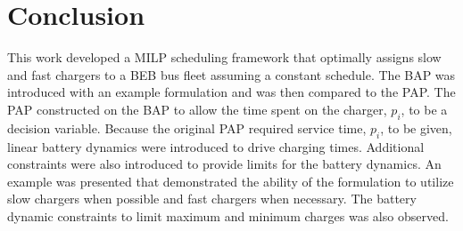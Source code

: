 \documentclass[letterpaper, 10pt, conference]{IEEEtran}
\begin{document}
\section{Conclusion}
\label{sec:conclusion}
This work developed a MILP scheduling framework that optimally assigns slow and fast chargers to a BEB bus fleet assuming a constant schedule. The BAP was introduced with an example formulation and was then compared to the PAP. The PAP constructed on the BAP to allow the time spent on the charger, \(p_i\), to be a decision variable. Because the original PAP required service time, \(p_i\), to be given, linear battery dynamics were introduced to drive charging times. Additional constraints were also introduced to provide limits for the battery dynamics. An example was presented that demonstrated the ability of the formulation to utilize slow chargers when possible and fast chargers when necessary. The battery dynamic constraints to limit maximum and minimum charges was also observed.




\end{document}
